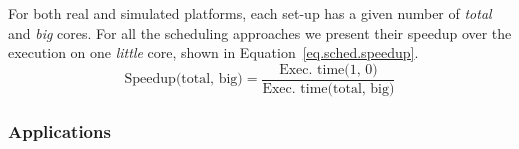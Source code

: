For both real and simulated platforms, each set-up has a given number of \textit{total} and \textit{big} cores.
For all the scheduling approaches we present their speedup over the execution on one \textit{little} core, shown in Equation~\ref{eq.sched.speedup}. 
\begingroup\makeatletter\def\f@size{8}\check@mathfonts
\begin{equation}
  \text{Speedup(total, big)} = \frac{\text{Exec. time(1, 0)}}{\text{Exec. time(total, big)}}
  \label{eq.sched.speedup}
\end{equation}
\endgroup


\subsubsection{Applications}

